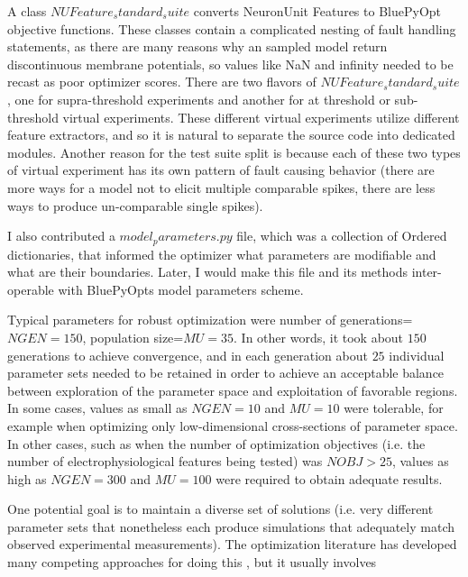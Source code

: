 
A class $NUFeature_standard_suite$ converts NeuronUnit Features to BluePyOpt objective functions. These classes contain a complicated nesting of fault handling statements, as there are many reasons why an sampled model return discontinuous membrane potentials, so values like NaN and infinity needed to be recast as poor optimizer scores. There are two flavors of $NUFeature_standard_suite$, one for supra-threshold experiments and another for at threshold or sub-threshold virtual experiments. These different virtual experiments utilize different feature extractors, and so it is natural to separate the source code into dedicated modules. Another reason for the test suite split is because each of these two types of virtual experiment has its own pattern of fault causing behavior (there are more ways for a model not to elicit multiple comparable spikes, there are less ways to produce un-comparable single spikes).
 
I also contributed a $model_parameters.py$ file, which was a collection of Ordered dictionaries, that informed the optimizer what parameters are modifiable and what are their boundaries. Later, I would make this file and its methods inter-operable with BluePyOpts model parameters scheme.


Typical parameters for robust optimization were number of generations=$NGEN=150$, population size=$MU=35$.
In other words, it took about $150$ generations to achieve convergence, and in each generation about $25$ individual parameter sets needed to be retained in order to achieve an acceptable balance between exploration of the parameter space and exploitation of favorable regions.
In some cases, values as small as $NGEN=10$ and $MU=10$ were tolerable, for example when optimizing only low-dimensional cross-sections of parameter space.
In other cases, such as when the number of optimization objectives (i.e. the number of electrophysiological features being tested) was $NOBJ>25$, values as high as $NGEN=300$ and $MU=100$ were required to obtain adequate results.

One potential goal is to maintain a diverse set of solutions (i.e. very different parameter sets that nonetheless each produce simulations that adequately match observed experimental measurements).
The optimization literature has developed many competing approaches for doing this \cite{deb2000fast}, but it usually involves  

